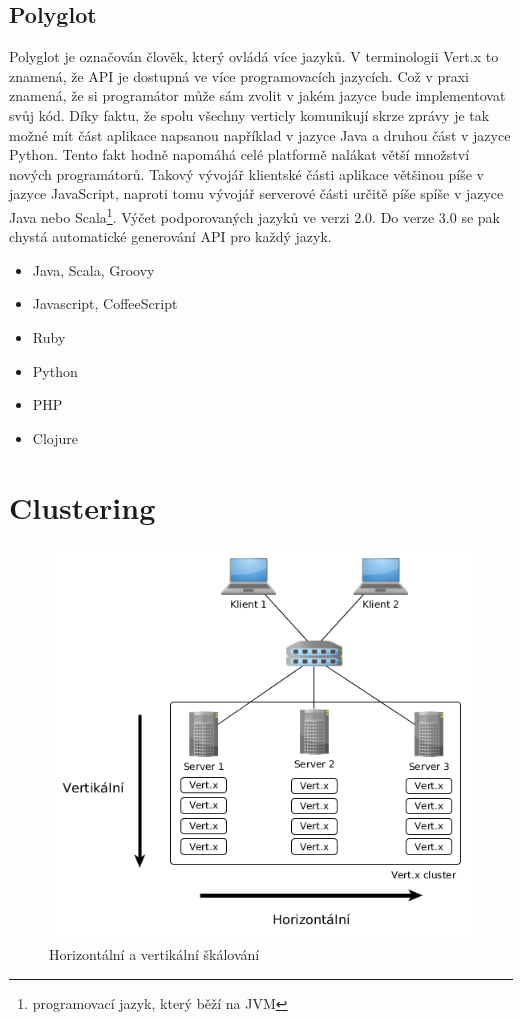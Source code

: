 \subsection{Polyglot}

Polyglot je označován člověk, který ovládá více jazyků. V terminologii Vert.x to znamená, že API je dostupná ve více programovacích jazycích. Což v praxi znamená, že si programátor může sám zvolit v jakém jazyce bude implementovat svůj kód. Díky faktu, že spolu všechny verticly komunikují skrze zprávy je tak možné mít část aplikace napsanou například v jazyce Java a druhou část v jazyce Python. Tento fakt hodně napomáhá celé platformě nalákat větší množství nových programátorů. Takový vývojář klientské části aplikace většinou píše v jazyce JavaScript, naproti tomu vývojář serverové části určitě píše spíše v jazyce Java nebo Scala\footnote{programovací jazyk, který běží na JVM}. Výčet podporovaných jazyků ve verzi 2.0. Do verze 3.0 se pak chystá automatické generování API pro každý jazyk.

\begin{itemize}
\item{Java, Scala, Groovy}
\item{Javascript, CoffeeScript}
\item{Ruby}
\item{Python}
\item{PHP}
\item{Clojure}
\end{itemize}

\section{Clustering}

\begin{figure}
\begin{centering}
\includegraphics[scale=0.5]{obrazky/scaling_example}
\par\end{centering}
\caption{Horizontální a vertikální škálování\label{fig:scaling_example}}
\end{figure}

